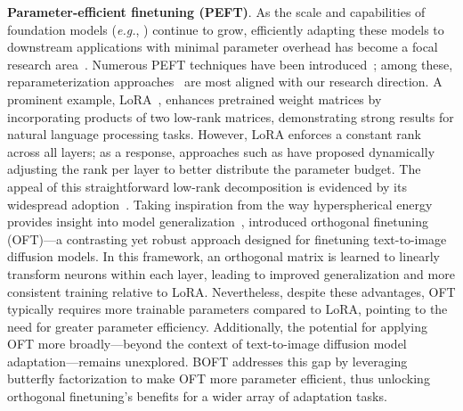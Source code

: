 \textbf{Parameter-efficient finetuning (PEFT)}. As the scale and capabilities of foundation models (\emph{e.g.}, \cite{brown2020language,radford2021learning,rombach2022high,kirillov2023segment}) continue to grow, efficiently adapting these models to downstream applications with minimal parameter overhead has become a focal research area~\cite{treviso2023efficient,ding2023parameter,lialin2023scaling}. Numerous PEFT techniques have been introduced~\cite{houlsby2019parameter,aghajanyan2020intrinsic,hulora2022,edalati2022krona,wang2022adamix,gheini2021cross,zaken2022bitfit,guo2020parameter,sung2021training,ansell2022composable,lester2021power,li2021prefix,vu2022spot,he2021towards,mao2021unipelt,karimi2021compacter,liu2022few,sung2022lst,chen2022parameter,jia2022visual,chen2022adaptformer,zhang2022neural,jie2023fact,lian2022scaling,luo2023towards}; among these, reparameterization approaches~\cite{aghajanyan2020intrinsic,hulora2022,edalati2022krona} are most aligned with our research direction. A prominent example, LoRA~\cite{hulora2022}, enhances pretrained weight matrices by incorporating products of two low-rank matrices, demonstrating strong results for natural language processing tasks. However, LoRA enforces a constant rank across all layers; as a response, approaches such as \cite{zhang2022adaptive,valipour2022dylora,zhang2023increlora} have proposed dynamically adjusting the rank per layer to better distribute the parameter budget. The appeal of this straightforward low-rank decomposition is evidenced by its widespread adoption~\cite{dettmers2023qlora,zi2023delta,chavan2023one}. Taking inspiration from the way hyperspherical energy provides insight into model generalization~\cite{liu2018learning,liu2021orthogonal}, \cite{qiu2023controlling} introduced orthogonal finetuning (OFT)—a contrasting yet robust approach designed for finetuning text-to-image diffusion models. In this framework, an orthogonal matrix is learned to linearly transform neurons within each layer, leading to improved generalization and more consistent training relative to LoRA. Nevertheless, despite these advantages, OFT typically requires more trainable parameters compared to LoRA, pointing to the need for greater parameter efficiency. Additionally, the potential for applying OFT more broadly—beyond the context of text-to-image diffusion model adaptation—remains unexplored. BOFT addresses this gap by leveraging butterfly factorization to make OFT more parameter efficient, thus unlocking orthogonal finetuning’s benefits for a wider array of adaptation tasks.

